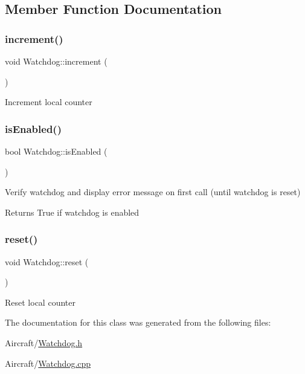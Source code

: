 \subsection{Member Function Documentation}
\mbox{\label{class_m210_1_1_watchdog_a4342960b3b6881def5dc2342fee990ba}} 
\subsubsection{\texorpdfstring{increment()}{increment()}}
{\footnotesize\ttfamily void Watchdog\+::increment (\begin{DoxyParamCaption}{ }\end{DoxyParamCaption})}

Increment local counter \mbox{\label{class_m210_1_1_watchdog_a235a91f4745f75bd5222ecc57d01f9ef}} 
\subsubsection{\texorpdfstring{is\+Enabled()}{isEnabled()}}
{\footnotesize\ttfamily bool Watchdog\+::is\+Enabled (\begin{DoxyParamCaption}{ }\end{DoxyParamCaption})}

Verify watchdog and display error message on first call (until watchdog is reset) \begin{DoxyReturn}{Returns}
True if watchdog is enabled 
\end{DoxyReturn}
\mbox{\label{class_m210_1_1_watchdog_ad64f941736836164bf9049ead5ca31b2}} 
\subsubsection{\texorpdfstring{reset()}{reset()}}
{\footnotesize\ttfamily void Watchdog\+::reset (\begin{DoxyParamCaption}{ }\end{DoxyParamCaption})}

Reset local counter 

The documentation for this class was generated from the following files\+:\begin{DoxyCompactItemize}
\item 
Aircraft/\mbox{\hyperlink{_watchdog_8h}{Watchdog.\+h}}\item 
Aircraft/\mbox{\hyperlink{_watchdog_8cpp}{Watchdog.\+cpp}}\end{DoxyCompactItemize}
